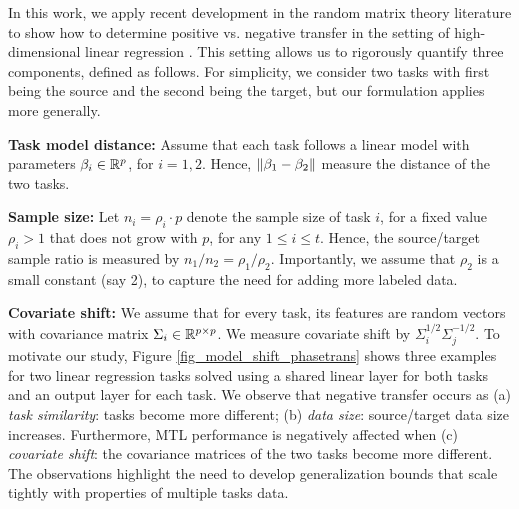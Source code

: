 In this work, we apply recent development in the random matrix theory literature to show how to determine positive vs. negative transfer in the setting of high-dimensional linear regression \cite{HMRT19,BLLT20}.
This setting allows us to rigorously quantify three components, defined as follows.
For simplicity, we consider two tasks with first being the source and the second being the target, but our formulation applies more generally.
\squishlist
	\item \textbf{Task model distance:} Assume that each task follows a linear model with parameters $\beta_i\in\mathbb{R}^p$, for $i=1, 2$.
	Hence, $\|\beta_1 - \beta_2\|$ measure the distance of the two tasks.
	\item \textbf{Sample size:} Let $n_i = \rho_i \cdot p$ denote the sample size of task $i$, for a fixed value $\rho_i > 1$ that does not grow with $p$, for any $1\le i\le t$.
	Hence, the source/target sample ratio is measured by $n_1 / n_2 = \rho_1 / \rho_2$.
	Importantly, we assume that $\rho_2$ is a small constant (say 2), to capture the need for adding more labeled data.
	\item \textbf{Covariate shift:} We assume that for every task, its features are random vectors with covariance matrix $\Sigma_i\in\mathbb{R}^{p\times p}$.
	We measure covariate shift by $\Sigma_i^{1/2}\Sigma_j^{-1/2}$.
\squishend
To motivate our study, Figure \ref{fig_model_shift_phasetrans} shows three examples for two linear regression tasks solved using a shared linear layer for both tasks and an output layer for each task.
We observe that negative transfer occurs as (a) \textit{task similarity}: tasks become more different; (b) \textit{data size}: source/target data size increases.
Furthermore, MTL performance is negatively affected when (c) \textit{covariate shift}: the covariance matrices of the two tasks become more different.
The observations highlight the need to develop generalization bounds that scale tightly with properties of multiple tasks data.


